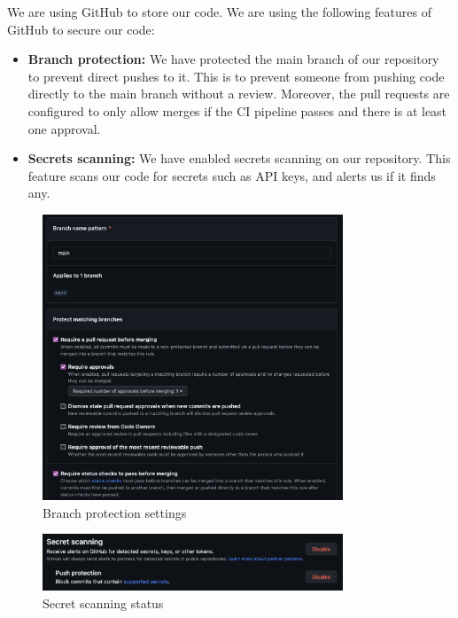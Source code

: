 \documentclass[12pt,x11names]{article}
\begin{document}
We are using GitHub to store our code. We are using the following features of GitHub to
secure our code:

\begin{itemize}
    \item \textbf{Branch protection:} We have protected the main branch of our repository
    to prevent direct pushes to it. This is to prevent someone from pushing code directly
    to the main branch without a review. Moreover, the pull requests are configured to
    only allow merges if the CI pipeline passes and there is at least one approval.
    \item \textbf{Secrets scanning:} We have enabled secrets scanning on our repository.
    This feature scans our code for secrets such as API keys, and alerts us if it finds
    any.
\end{itemize}

\begin{figure}[H]
  \centering
  \includegraphics[width=0.8\textwidth]{imgs/branch_protection.png}
  \caption{Branch protection settings}
\end{figure}

\begin{figure}[H]
  \centering
  \includegraphics[width=0.8\textwidth]{imgs/secret_scanning.png}
  \caption{Secret scanning status}
\end{figure}
\end{document}
